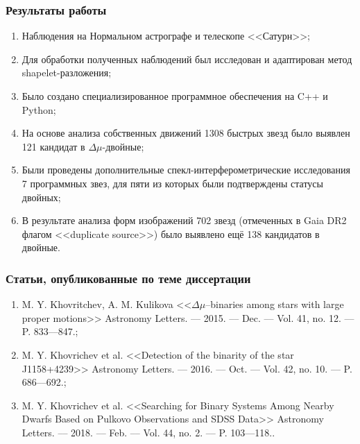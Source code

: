 \begin{frame}
\frametitle{Результаты работы}
{\footnotesize
\begin{enumerate}
 \item Наблюдения на Нормальном астрографе и телескопе <<Сатурн>>;
 \item Для обработки полученных наблюдений был исследован и адаптирован метод shapelet-разложения;
 \item Было создано специализированное программное обеспечения на C++ и Python;
 \item На основе анализа собственных движений 1308 быстрых звезд было выявлен 121 кандидат в $\Delta\mu$-двойные;
 \item Были проведены дополнительные спекл-интерферометрические исследования 7 программных звез, для пяти из которых были подтверждены статусы двойных;
 \item В результате анализа форм изображений 702 звезд (отмеченных в Gaia DR2 флагом <<duplicate source>>) было выявлено ещё 138 кандидатов в двойные.
\end{enumerate}
}
\end{frame}


\begin{frame}
\frametitle{Статьи, опубликованные по теме диссертации}
{\footnotesize
\begin{enumerate}
 \item M. Y. Khovritchev, A. M. Kulikova <<$\Delta\mu$–binaries among stars with large proper motions>> Astronomy Letters. –– 2015. –– Dec. –– Vol. 41, no. 12. –– P. 833––847.;
 \item M. Y. Khovrichev et al. <<Detection of the binarity of the star J1158+4239>> Astronomy Letters. –– 2016. –– Oct. –– Vol. 42, no. 10. –– P. 686––692.;
 \item M. Y. Khovrichev et al. <<Searching for Binary Systems Among Nearby Dwarfs Based on Pulkovo Observations and SDSS Data>> Astronomy Letters. ––
2018. –– Feb. –– Vol. 44, no. 2. –– P. 103––118..
\end{enumerate}
}
\end{frame}




